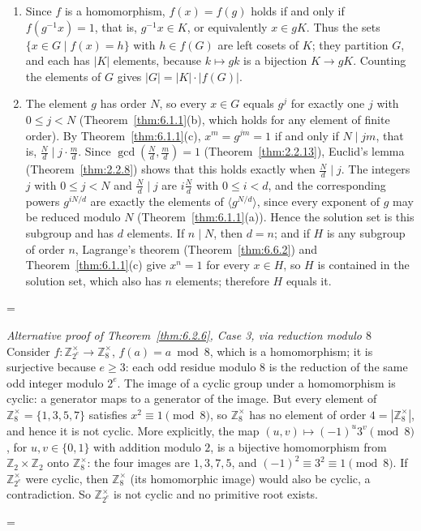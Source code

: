 \documentclass[11pt]{article}
\makeatletter
\theoremstyle{ntstyle}
\let\nt@closedisplay\]
\def\nt@guardedclose{\@ifnextchar\par{\nt@closeafterpar}{\@ifnextchar\end{\postdisplaypenalty\@M\nt@closedisplay}{\nt@closedisplay}}}
\def\nt@closeafterpar\par{\@ifnextchar\par{\nt@closeafterpar}{\@ifnextchar\end{\postdisplaypenalty\@M\nt@closedisplay\par}{\nt@closedisplay\par}}}
\renewenvironment{proof}[1][\proofname]{\par
  \pushQED{\qed}\normalfont\topsep\medskipamount\edef\nt@afterproof{\@endparpenalty=\the\@endparpenalty\relax}\@beginparpenalty\@M\@endparpenalty\@M\let\]\nt@guardedclose\trivlist\item[]\textit{#1\@addpunct{.}} \ignorespaces}{\ifvmode\addpenalty\@M\fi\popQED\nt@afterproof\endtrivlist\@endpefalse}
\newenvironment{altproof}[1][\proofname]{\begin{proof}[#1]\renewcommand{\qedsymbol}{}}{\end{proof}}
\newcommand{\ZmodUnits}[1]{\mathbb{Z}_{#1}^{\times}}
\makeatother
\begin{document}
\begin{proof}

	\begin{enumerate}[label={\alph*)}]
		\item Since $f$ is a homomorphism, $f(x)=f(g)$ holds if and only if
		      $f(g^{-1}x)=1$, that is, $g^{-1}x\in K$, or equivalently $x\in gK$.
		      Thus the sets $\{x\in G\mid f(x)=h\}$ with $h\in f(G)$ are left
		      cosets of $K$; they partition $G$, and each has $|K|$ elements,
		      because $k\mapsto gk$ is a bijection $K\to gK$. Counting the elements
		      of $G$ gives $|G|=|K|\cdot|f(G)|$.
		\item The element $g$ has order $N$, so every $x\in G$ equals $g^j$ for
		      exactly one $j$ with $0\le j<N$ (Theorem~\ref{thm:6.1.1}(b), which holds
		      for any element of finite order). By Theorem~\ref{thm:6.1.1}(c),
		      $x^m=g^{jm}=1$ if and only if $N\mid jm$, that is,
		      $\frac{N}{d}\mid j\cdot\frac{m}{d}$. Since $\gcd(\frac{N}{d},\frac{m}{d})=1$
		      (Theorem~\ref{thm:2.2.13}), Euclid's lemma (Theorem~\ref{thm:2.2.8})
		      shows that this holds exactly when $\frac{N}{d}\mid j$. The integers $j$
		      with $0\le j<N$ and $\frac{N}{d}\mid j$ are $i\frac{N}{d}$ with
		      $0\le i<d$, and the corresponding powers $g^{iN/d}$ are exactly the
		      elements of $\langle g^{N/d}\rangle$, since every exponent of $g$ may be
		      reduced modulo $N$ (Theorem~\ref{thm:6.1.1}(a)). Hence the solution set
		      is this subgroup and has $d$ elements. If $n\mid N$, then $d=n$; and if
		      $H$ is any subgroup of order $n$, Lagrange's theorem
		      (Theorem~\ref{thm:6.6.2}) and Theorem~\ref{thm:6.1.1}(c) give $x^n=1$ for
		      every $x\in H$, so $H$ is contained in the solution set, which also has
		      $n$ elements; therefore $H$ equals it.
	\end{enumerate}

\end{proof}
\begin{altproof}[Alternative proof of Theorem~\ref{thm:6.2.6}, Case 3, via reduction modulo $8$] Consider $f : \ZmodUnits{2^e} \to
		\ZmodUnits{8}$, $f(a) = a \bmod 8$, which is a
	homomorphism; it is surjective because $e\ge3$: each odd residue
	modulo $8$ is the reduction of the same odd integer modulo $2^e$. The image of a cyclic group under a homomorphism is
	cyclic: a generator maps to a generator of the image. But every element of $\ZmodUnits{8} = \{1, 3, 5, 7\}$
	satisfies $x^{2} \equiv 1 \pmod{8}$, so $\ZmodUnits{8}$ has no
	element of order $4=|\ZmodUnits{8}|$, and hence it is not cyclic.
	More explicitly, the map $(u,v)\mapsto(-1)^u3^v\pmod8$, for
	$u,v\in\{0,1\}$ with addition modulo $2$, is a bijective homomorphism
	from $\mathbb{Z}_2\times\mathbb{Z}_2$ onto $\ZmodUnits{8}$:
	the four images are $1,3,7,5$, and $(-1)^2\equiv3^2\equiv1\pmod8$.
	If $\ZmodUnits{2^e}$ were cyclic, then
	$\ZmodUnits{8}$ (its homomorphic image) would also be cyclic,
	a contradiction. So $\ZmodUnits{2^e}$ is not cyclic and no
	primitive root exists.

\end{altproof}
\end{document}
